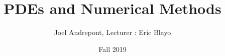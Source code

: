 \documentclass[14pt]{book}
\begin{document}
\title{PDEs and Numerical Methods}
\author{Joel Andrepont, Lecturer : Eric Blayo}
\date{Fall 2019}
\maketitle
\tableofcontents



%
%
%
%


\printbibliography
\end{document}
